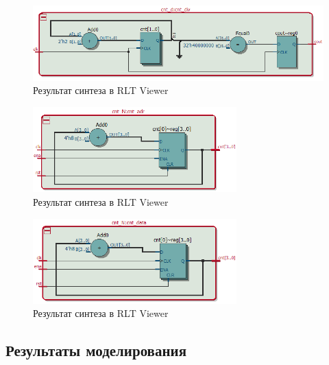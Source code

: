 \begin{figure}[H]
\begin{center}
	\includegraphics[width=\textwidth]{elab7_1_rtl_1}
	\caption{Результат синтеза  в RLT Viewer}
	\label{fig:elab7_1_rtl_1}
\end{center}
\end{figure}

\begin{figure}[H]
\begin{center}
	\includegraphics[width=0.7\textwidth]{elab7_1_rtl_2}
	\caption{Результат синтеза  в RLT Viewer}
	\label{fig:elab7_1_rtl_2}
\end{center}
\end{figure}

\begin{figure}[H]
\begin{center}
	\includegraphics[width=0.7\textwidth]{elab7_1_rtl_3}
	\caption{Результат синтеза  в RLT Viewer}
	\label{fig:elab7_1_rtl_3}
\end{center}
\end{figure}

\subsection{Результаты моделирования}
\label{sec:elab7_1_modeling}

